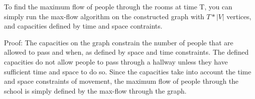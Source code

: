 \documentclass[11pt]{article}
\begin{document}
To find the maximum flow of people through the rooms at time T, you can simply
run the max-flow algorithm on the constructed graph with $T*|V|$ vertices, and
capacities defined by time and space contraints. 

Proof: The capacities on the graph constrain the number of people that are allowed
to pass and when, as defined by space and time constraints. The defined capacities 
do not allow people to
pass through a hallway unless they have sufficient time and space to do so. Since
the capacities take into account the time and space constraints of movement, the
maximum flow of people through the school is simply defined by the max-flow 
through the graph. 

\label{pg:p4-continuation}
\newpage
 
 
% 
%
% 
% 
\end{document}
